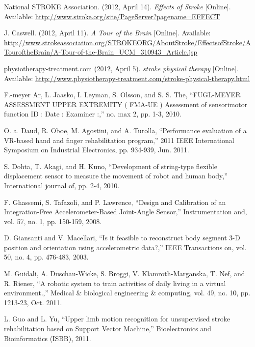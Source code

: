 \documentclass[journal]{IEEEtran}
\begin{document}
\begin{thebibliography}{1} 
  
 National STROKE Association. (2012, April 14). \emph{Effects of Stroke} [Online]. Available: \url{http://www.stroke.org/site/PageServer?pagename=EFFECT}

 J. Caswell. (2012, April 11). \emph{A Tour of the Brain} [Online]. Available: \url{http://www.strokeassociation.org/STROKEORG/AboutStroke/EffectsofStroke/ATouroftheBrain/A-Tour-of-the-Brain_UCM_310943_Article.jsp}

 physiotherapy-treatment.com (2012, April 5). \emph{stroke physical therapy} [Online]. Available: \url{http://www.physiotherapy-treatment.com/stroke-physical-therapy.html}

 F.-meyer Ar, L. Jaasko, I. Leyman, S. Olsson, and S. S. The, “FUGL-MEYER ASSESSMENT UPPER EXTREMITY ( FMA-UE ) Assessment of sensorimotor function ID : Date : Examiner :,” no. max 2, pp. 1-3, 2010.

 O. a. Daud, R. Oboe, M. Agostini, and A. Turolla, “Performance evaluation of a VR-based hand and finger rehabilitation program,” 2011 IEEE International Symposium on Industrial Electronics, pp. 934-939, Jun. 2011.

 S. Dohta, T. Akagi, and H. Kuno, “Development of string-type flexible displacement sensor to measure the movement of robot and human body,” International journal of, pp. 2-4, 2010.

 F. Ghassemi, S. Tafazoli, and P. Lawrence, “Design and Calibration of an Integration-Free Accelerometer-Based Joint-Angle Sensor,” Instrumentation and, vol. 57, no. 1, pp. 150-159, 2008.

 D. Giansanti and V. Macellari, “Is it feasible to reconstruct body segment 3-D position and orientation using accelerometric data?,” IEEE Transactions on, vol. 50, no. 4, pp. 476-483, 2003.

 M. Guidali, A. Duschau-Wicke, S. Broggi, V. Klamroth-Marganska, T. Nef, and R. Riener, “A robotic system to train activities of daily living in a virtual environment.,” Medical \& biological engineering \& computing, vol. 49, no. 10, pp. 1213-23, Oct. 2011.

 L. Guo and L. Yu, “Upper limb motion recognition for unsupervised stroke rehabilitation based on Support Vector Machine,” Bioelectronics and Bioinformatics (ISBB), 2011.


\end{thebibliography}
\end{document}

